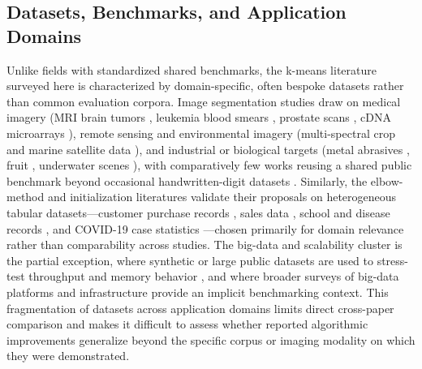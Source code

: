 \subsection{Datasets, Benchmarks, and Application Domains}
Unlike fields with standardized shared benchmarks, the k-means literature surveyed here is characterized by domain-specific, often bespoke datasets rather than common evaluation corpora. Image segmentation studies draw on medical imagery (MRI brain tumors \cite{alam2019automatic}, leukemia blood smears \cite{h2020leukemia,fatma2014leukemia}, prostate scans \cite{sammouda2021optimized}, cDNA microarrays \cite{wang2015improved}), remote sensing and environmental imagery (multi-spectral crop and marine satellite data \cite{kazakhstan2019multi,manahoran2017means}), and industrial or biological targets (metal abrasives \cite{zhang2023metal}, fruit \cite{wang2016method}, underwater scenes \cite{zhu2022means}), with comparatively few works reusing a shared public benchmark beyond occasional handwritten-digit datasets \cite{li2018experiment}. Similarly, the elbow-method and initialization literatures validate their proposals on heterogeneous tabular datasets---customer purchase records \cite{tabianan2022means,syakur2018integration}, sales data \cite{abdillah2025implementation}, school and disease records \cite{permadi2023means,wala2024heart}, and COVID-19 case statistics \cite{indraputra2020means}---chosen primarily for domain relevance rather than comparability across studies. The big-data and scalability cluster is the partial exception, where synthetic or large public datasets are used to stress-test throughput and memory behavior \cite{jain2014adapting,chen2019big,xie2020improvement,awad2022improved}, and where broader surveys of big-data platforms and infrastructure \cite{singh2014survey,tsai2015big,mahdi2021scalable} provide an implicit benchmarking context. This fragmentation of datasets across application domains limits direct cross-paper comparison and makes it difficult to assess whether reported algorithmic improvements generalize beyond the specific corpus or imaging modality on which they were demonstrated.

